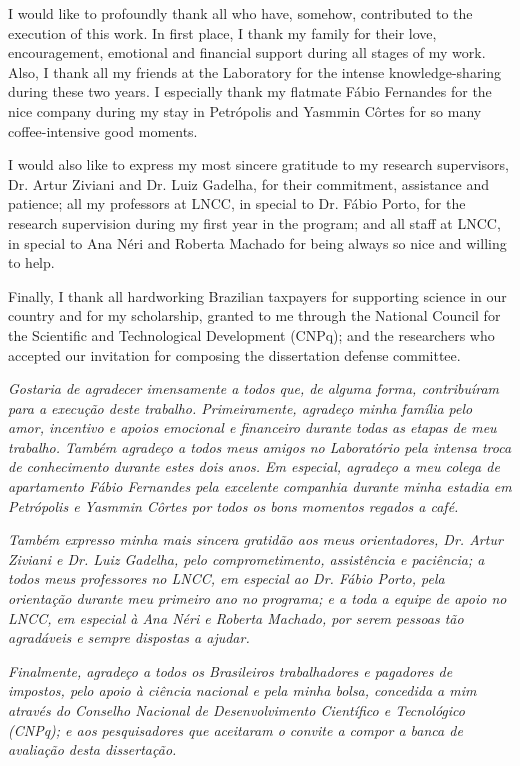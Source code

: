 \documentclass[
	12pt,				%
	openright,			%
	oneside,			%
	a4paper,			%
	sumario=tradicional,%
	french,				%
	spanish,			%
	brazil,				%
    english
	]{abntex2}
\begin{document}
\begin{agradecimentos}
I would like to profoundly thank all who have, somehow, contributed to the execution of this work.
In first place, I thank my family for their love, encouragement, emotional and financial support during all stages of my work.
Also, I thank all my friends at the Laboratory for the intense knowledge-sharing during these two years.
I especially thank my flatmate Fábio Fernandes for the nice company during my stay in Petrópolis and 
Yasmmin Côrtes for so many coffee-intensive good moments.

I would also like to express my most sincere gratitude to my research supervisors, Dr. Artur Ziviani and Dr. Luiz Gadelha, for their commitment, assistance and patience;
all my professors at LNCC, in special to Dr. Fábio Porto, for the research supervision during my first year in the program;
and all staff at LNCC, in special to Ana Néri and Roberta Machado for being always so nice and willing to help.

Finally, I thank all hardworking Brazilian taxpayers for supporting science in our country and for my scholarship, granted to me through the National Council for the Scientific and Technological Development (CNPq); and the researchers who accepted our invitation for composing the dissertation defense committee. 
\\[1\baselineskip]

\begin{footnotesize}
\textit{Gostaria de agradecer imensamente a todos que, de alguma forma, contribuíram para a execução deste trabalho.
Primeiramente, agradeço minha família pelo amor, incentivo e apoios emocional e financeiro durante todas as etapas de meu trabalho.
Também agradeço a todos meus amigos no Laboratório pela intensa troca de conhecimento durante estes dois anos.
Em especial, agradeço a meu colega de apartamento Fábio Fernandes pela excelente companhia durante minha estadia em Petrópolis e
Yasmmin Côrtes por todos os bons momentos regados a café.}

\textit{Também expresso minha mais sincera gratidão aos meus orientadores, Dr. Artur Ziviani e Dr. Luiz Gadelha, pelo comprometimento, assistência e paciência;
a todos meus professores no LNCC, em especial ao Dr. Fábio Porto, pela orientação durante meu primeiro ano no programa;
e a toda a equipe de apoio no LNCC, em especial à Ana Néri e Roberta Machado, por serem pessoas tão agradáveis e sempre dispostas a ajudar.}


\textit{Finalmente, agradeço a todos os Brasileiros trabalhadores e pagadores de impostos, pelo apoio à ciência nacional e pela minha bolsa, concedida a mim através do Conselho Nacional de Desenvolvimento Científico e Tecnológico (CNPq); e aos pesquisadores que aceitaram o convite a compor a banca de avaliação desta dissertação.}
\end{footnotesize}

\end{agradecimentos}
\end{document}
